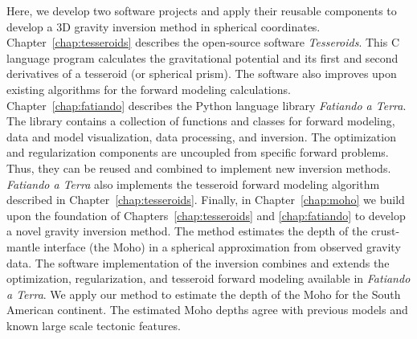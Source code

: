 Here, we develop two software projects and apply their reusable components to
develop a 3D gravity inversion method in spherical coordinates.
Chapter~\ref{chap:tesseroids} describes the open-source software
\textit{Tesseroids}.
This C language program calculates the gravitational potential and its first
and second derivatives of a tesseroid (or spherical prism).
The software also improves upon existing algorithms for the forward modeling
calculations.
Chapter~\ref{chap:fatiando} describes the Python language library
\textit{Fatiando a Terra}.
The library contains a collection of functions and classes for forward
modeling, data and model visualization, data processing, and inversion.
The optimization and regularization components are uncoupled from specific
forward problems.
Thus, they can be reused and combined to implement new inversion methods.
\textit{Fatiando a Terra} also implements the tesseroid forward modeling
algorithm described in Chapter~\ref{chap:tesseroids}.
Finally, in Chapter~\ref{chap:moho} we build upon the foundation of
Chapters~\ref{chap:tesseroids} and \ref{chap:fatiando} to develop a novel
gravity inversion method.
The method estimates the depth of the crust-mantle interface (the Moho) in a
spherical approximation from observed gravity data.
The software implementation of the inversion combines and extends the
optimization, regularization, and tesseroid forward modeling available in
\textit{Fatiando a Terra}.
We apply our method to estimate the depth of the Moho for the South American
continent.
The estimated Moho depths agree with previous models and known large scale
tectonic features.
